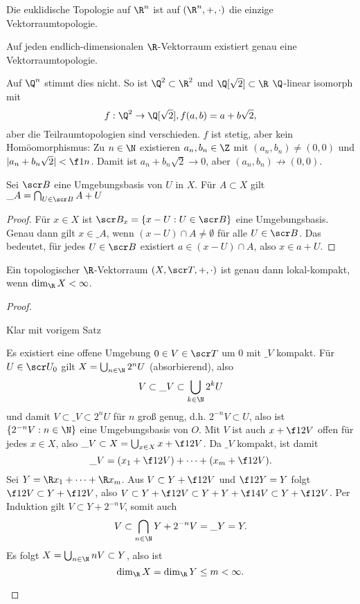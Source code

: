 \begin{kor}
	Die euklidische Topologie auf $\R^n$ ist auf $(\R^n, +, \cdot)$ die einzige Vektorraumtopologie.

	Auf jeden endlich-dimensionalen $\R$-Vektorraum existiert genau eine Vektorraumtopologie.
	\begin{note}
		Auf $\Q^n$ stimmt dies nicht.
		So ist $\Q^2 \subset \R^2$ und $\Q[\sqrt 2] \subset \R$ $\Q$-linear isomorph mit
		\[
			f: \Q^2 \to \Q[\sqrt 2], f(a,b) = a + b \sqrt{2},
		\]
		aber die Teilraumtopologien sind verschieden.
		$f$ ist stetig, aber kein Homöomorphismus:
		Zu $n \in \N$ existieren $a_n, b_n \in \Z$ mit $(a_n, b_n) \neq (0,0)$ und $|a_n + b_n \sqrt{2}| < \f 1n$.
		Damit ist $a_n + b_n \sqrt{2} \to 0$, aber $(a_n, b_n) \not\to (0,0)$.
	\end{note}
\end{kor}

\begin{lem}
	Sei $\scr B$ eine Umgebungsbasis von $U$ in $X$.
	Für $A \subset X$ gilt $\_A = \bigcap_{U \in \scr B} A + U$
	\begin{proof}
		Für $x \in X$ ist $\scr B_x = \{ x - U : U \in \scr B\}$ eine Umgebungsbasis.
		Genau dann gilt $x \in \_A$, wenn $(x-U) \cap A \neq \emptyset$ für alle $U \in \scr B$.
		Das bedeutet, für jedes $U \in \scr B$ existiert $a \in (x-U) \cap A$, also $x \in a + U$.
	\end{proof}
\end{lem}

\begin{st}
	Ein topologischer $\R$-Vektorraum $(X, \scr T, +, \cdot)$ ist genau dann lokal-kompakt, wenn $\dim_{\R} X < \infty$.
	\begin{proof}
		\begin{segnb}[„$\impliedby$“]
			Klar mit vorigem Satz
		\end{segnb}
		\begin{segnb}[„$\implies$“]
			Es existiert eine offene Umgebung $0 \in V \in \scr T$ um $0$ mit $\_V$ kompakt.
			Für $U \in \scr U_0$ gilt $X = \bigcup_{n\in\N} 2^n U$ (absorbierend), also
			\[
				V \subset \_V \subset \bigcup_{k\in\N}2^k U
			\]
			und damit $V \subset \_V \subset 2^n U$ für $n$ groß genug, d.h. $2^{-n} V \subset U$, also ist $\{2^{-n} V : n\in \N\}$ eine Umgebungsbasis von $O$.
			Mit $V$ ist auch $x + \f 12 V$ offen für jedes $x \in X$, also $\_V \subset X = \bigcup_{x\in X} x + \f 12 V$.
			Da $\_V$ kompakt, ist damit
			\[
				\_V = (x_1 + \f 12 V) + \dotsb + (x_m + \f 12 V).
			\]
			Sei $Y = \R x_1 + \dotsb + \R x_m$.
			Aus $V \subset Y + \f 12 V$ und $\f 12 Y = Y$ folgt $\f 12 V \subset Y + \f 12 V$, also $V \subset Y + \f 12 V \subset Y + Y + \f 14 V \subset Y + \f 12 V$.
			Per Induktion gilt $V \subset Y + 2^{-n}V$, somit auch
			\[
				V
				\subset \bigcap_{n\in\N} Y + 2^{-n} V
				= \_Y
				= Y.
			\]
			Es folgt $X = \bigcup_{n\in\N} nV \subset Y$, also ist
			\[
				\dim_{\R} X = \dim_{\R} Y \le m < \infty.
			\]
		\end{segnb}
	\end{proof}
\end{st}


